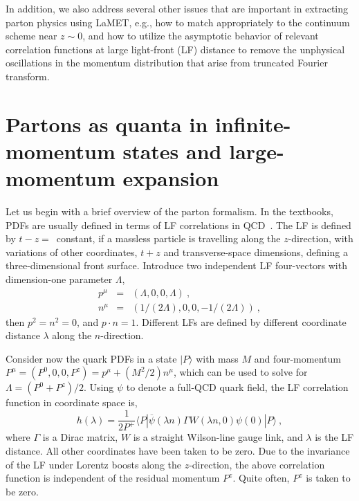 \documentclass[preprint,12pt]{elsarticle}
\begin{document}
In addition, we also address several other issues that are important in
extracting parton physics using LaMET, e.g., how to match appropriately to the continuum scheme near $z\sim 0$, and how to utilize the asymptotic behavior of relevant correlation functions at large light-front (LF) distance to remove the unphysical oscillations in the momentum distribution that arise from truncated Fourier transform.

\section{Partons as quanta in infinite-momentum states and
large-momentum expansion}
\label{sec:imf}

Let us begin with a brief overview of the parton formalism. In the textbooks, PDFs are usually defined in terms of
LF correlations in QCD~\cite{Sterman:1994ce,Collins:2011zzd}.
The LF is defined by $t-z=$~constant, if a massless particle
is travelling along the $z$-direction, with variations of other
coordinates, $t+z$ and transverse-space dimensions, defining
a three-dimensional front surface.
Introduce two independent LF four-vectors with dimension-one
parameter $\Lambda$,
\begin{eqnarray}
   p^\mu &=& (\Lambda, 0, 0, \Lambda )\ , \nonumber \\
   n^\mu &=& \left(1/(2\Lambda), 0, 0, -1/(2\Lambda)\right)\ ,
\end{eqnarray}
then $p^2=n^2=0$, and $p\cdot n=1$. Different LFs
are defined by different coordinate distance $\lambda$
along the $n$-direction.

Consider now the quark PDFs in a state
$|P\rangle$ with mass $M$ and four-momentum $P^\mu= (P^0,0,0,P^z)
= p^\mu + (M^2/2) n^\mu$, which can be used to solve for $\Lambda =(P^0+P^z)/2$.
Using $\psi$ to denote a full-QCD quark field,
the LF correlation function in coordinate space is,
\begin{equation}
     h(\lambda)= \frac{1}{2P^+}\langle P|\overline \psi(\lambda n)\Gamma W(\lambda n, 0)\psi(0)|P\rangle \ ,
\label{Eq:correlationm}
\end{equation}
where $\Gamma$ is a Dirac matrix, $W$ is a straight Wilson-line gauge link,
and $\lambda$ is the LF distance. All other coordinates have been taken
to be zero. Due to the invariance of the LF under Lorentz boosts along the $z$-direction, the
above correlation function is independent of the residual momentum $P^z$. Quite often, $P^z$ is taken to be zero.
\end{document}
